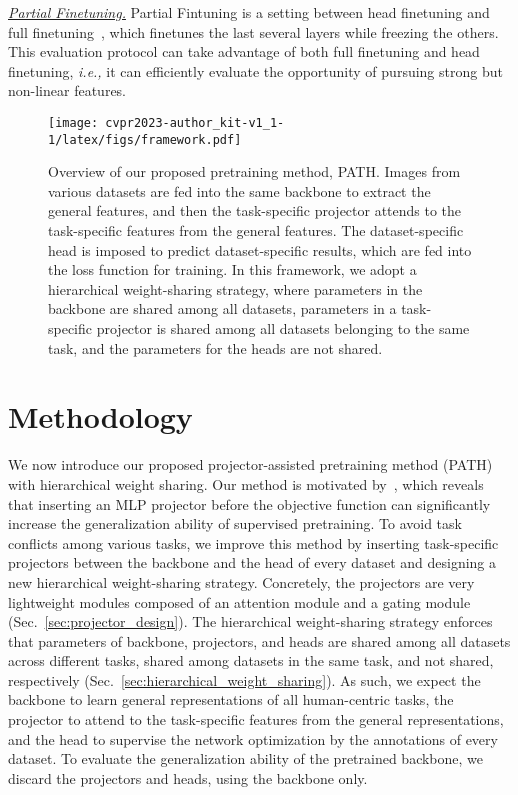 \documentclass[10pt,twocolumn,letterpaper]{article}
\begin{document}
\noindent \underline{\emph{Partial Finetuning.}} Partial Fintuning is a setting between head finetuning and full finetuning~\cite{he2022masked}, which finetunes the last several layers while freezing the others. This evaluation protocol can take advantage of both full finetuning and head finetuning, \emph{i.e.,} it can efficiently evaluate the opportunity of pursuing strong but non-linear features.

\begin{figure*}
    \centering
    \texttt{[image: cvpr2023-author\_kit-v1\_1-1/latex/figs/framework.pdf]}
    \caption{Overview of our proposed pretraining method, PATH. Images from various datasets are fed into the same backbone to extract the general features, and then the task-specific projector attends to the task-specific features from the general features. The dataset-specific head is imposed to predict dataset-specific results, which are fed into the loss function for training. In this framework, we adopt a hierarchical weight-sharing strategy, where parameters in the backbone are shared among all datasets, parameters in a task-specific projector is shared among all datasets belonging to the same task, and the parameters for the heads are not shared.}
    \label{fig:framework}
    \vspace{-1.5em}
\end{figure*}


\section{Methodology}
We now introduce our proposed projector-assisted pretraining method (PATH) with hierarchical weight sharing. Our method is motivated by~\cite{wang2022revisiting}, which reveals that inserting an MLP projector before the objective function can significantly increase the generalization ability of supervised pretraining. To avoid task conflicts among various tasks, we improve this method by inserting task-specific projectors between the backbone and the head of every dataset and designing a new hierarchical weight-sharing strategy. Concretely, the projectors are very lightweight modules composed of an attention module and a gating module (Sec.~\ref{sec:projector_design}). The hierarchical weight-sharing strategy enforces that parameters of backbone, projectors, and heads are shared among all datasets across different tasks, shared among datasets in the same task, and not shared, respectively (Sec.~\ref{sec:hierarchical_weight_sharing}). As such, we expect the backbone to learn general representations of all human-centric tasks, the projector to attend to the task-specific features from the general representations, and the head to supervise the network optimization by the annotations of every dataset. To evaluate the generalization ability of the pretrained backbone, we discard the projectors and heads, using the backbone only.
\end{document}
